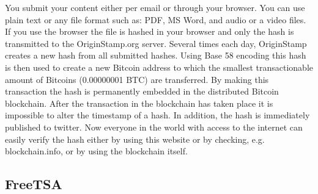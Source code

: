 You submit your content either per email or through your browser. You can use plain text or any file format such as: PDF, MS Word, and audio or a video files. If you use the browser the file is hashed in your browser and only the hash is transmitted to the OriginStamp.org server.
Several times each day, OriginStamp creates a new hash from all submitted hashes. Using Base 58 encoding this hash is then used to create a new Bitcoin address to which the smallest transactionable amount of Bitcoins (0.00000001 BTC) are transferred. By making this transaction the hash is permanently embedded in the distributed Bitcoin blockchain. After the transaction in the blockchain has taken place it is impossible to alter the timestamp of a hash. In addition, the hash is immediately published to twitter.
Now everyone in the world with access to the internet can easily verify the hash either by using this website or by checking, e.g. blockchain.info, or by using the blockchain itself.

\subsection{FreeTSA}



